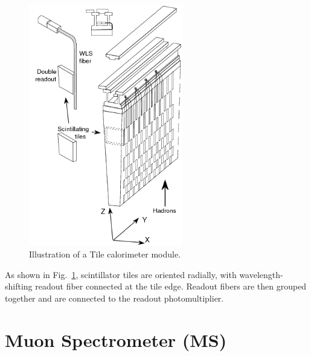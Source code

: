 \begin{figure}[htbp!]
    \centering
    \includegraphics[width=0.6\textwidth]{chapters/c4/figures/tile}
    \caption{Illustration of a Tile calorimeter module.}
    \label{fig:Tile}
\end{figure}

\par As shown in Fig.~\ref{fig:Tile}, scintillator tiles are oriented radially, with wavelength-shifting readout fiber connected at the tile edge. Readout fibers are then grouped together and are connected to the readout photomultiplier.

\section{Muon Spectrometer (MS)}
\label{sec:muon}

